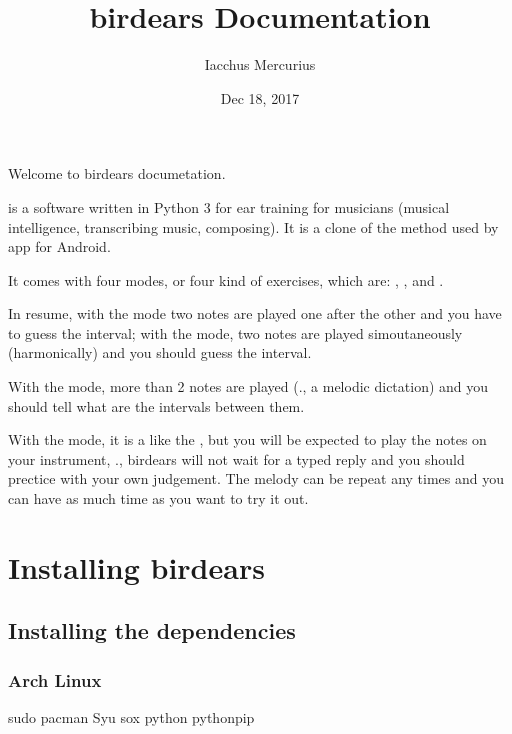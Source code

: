 \documentclass[letterpaper,10pt,english]{sphinxmanual}
\title{birdears Documentation}
\date{Dec 18, 2017}
\author{Iacchus Mercurius}
\begin{document}
\maketitle
\sphinxtableofcontents
{}\label{\detokenize{index::doc}}


Welcome to birdears documetation.

 is a software written in Python 3 for ear training for
musicians (musical intelligence, transcribing music, composing). It is a
clone of the method used by 
app for Android.

It comes with four modes, or four kind of exercises, which are:
, ,  and .

In resume, with the  mode two notes are played one after the
other and you have to guess the interval; with the  mode,
two notes are played simoutaneously (harmonically) and you should guess
the interval.

With the  mode, more than 2 notes are played (., a
melodic dictation) and you should tell what are the intervals between
them.

With the  mode, it is a like the , but you will
be expected to play the notes on your instrument, ., birdears will
not wait for a typed reply and you should prectice with your own
judgement. The melody can be repeat any times and you can have as much
time as you want to try it out.


\chapter{Installing birdears}
\label{\detokenize{installing:installing-birdears}}\label{\detokenize{installing::doc}}\label{\detokenize{installing:birdears-documentation}}

\section{Installing the dependencies}
\label{\detokenize{installing:installing-the-dependencies}}

\subsection{Arch Linux}
\label{\detokenize{installing:arch-linux}}
\begin{sphinxVerbatim}[commandchars=\\\{\}]
sudo pacman \PYGZhy{}Syu sox python python\PYGZhy{}pip
\end{sphinxVerbatim}
\end{document}
